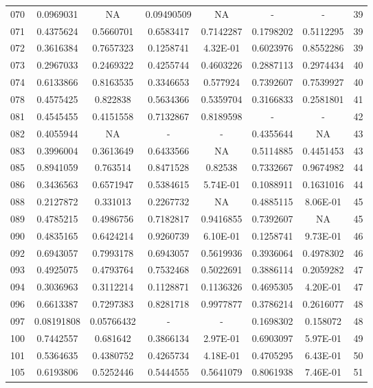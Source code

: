 \begin{anexosenv}
{\begin{longtable}{cccccccc}
070 & 0.0969031 & NA & 0.09490509 & NA & - & - &  39 \\ 
071 & 0.4375624 & 0.5660701 & 0.6583417 & 0.7142287 & 0.1798202 & 0.5112295 & 39 \\ 
072 & 0.3616384 & 0.7657323 & 0.1258741 & 4.32E-01 & 0.6023976 & 0.8552286 & 39 \\ 
073 & 0.2967033 & 0.2469322 & 0.4255744 & 0.4603226 & 0.2887113 & 0.2974434 & 40 \\ 
074 & 0.6133866 & 0.8163535 & 0.3346653 & 0.577924 & 0.7392607 & 0.7539927 & 40 \\ 
078 & 0.4575425 & 0.822838 & 0.5634366 & 0.5359704 & 0.3166833 & 0.2581801 & 41 \\ 
081 & 0.4545455 & 0.4151558 & 0.7132867 & 0.8189598 & - & - &  42 \\ 
082 & 0.4055944 & NA & - & - &  0.4355644 & NA & 43 \\ 
083 & 0.3996004 & 0.3613649 & 0.6433566 & NA & 0.5114885 & 0.4451453 & 43 \\ 
085 & 0.8941059 & 0.763514 & 0.8471528 & 0.82538 & 0.7332667 & 0.9674982 & 44 \\ 
086 & 0.3436563 & 0.6571947 & 0.5384615 & 5.74E-01 & 0.1088911 & 0.1631016 & 44 \\ 
088 & 0.2127872 & 0.331013 & 0.2267732 & NA & 0.4885115 & 8.06E-01 & 45 \\ 
089 & 0.4785215 & 0.4986756 & 0.7182817 & 0.9416855 & 0.7392607 & NA & 45 \\ 
090 & 0.4835165 & 0.6424214 & 0.9260739 & 6.10E-01 & 0.1258741 & 9.73E-01 & 46 \\ 
092 & 0.6943057 & 0.7993178 & 0.6943057 & 0.5619936 & 0.3936064 & 0.4978302 & 46 \\ 
093 & 0.4925075 & 0.4793764 & 0.7532468 & 0.5022691 & 0.3886114 & 0.2059282 & 47 \\ 
094 & 0.3036963 & 0.3112214 & 0.1128871 & 0.1136326 & 0.4695305 & 4.20E-01 & 47 \\ 
096 & 0.6613387 & 0.7297383 & 0.8281718 & 0.9977877 & 0.3786214 & 0.2616077 & 48 \\ 
097 & 0.08191808 & 0.05766432 & - & - &  0.1698302 & 0.158072 & 48 \\ 
100 & 0.7442557 & 0.681642 & 0.3866134 & 2.97E-01 & 0.6903097 & 5.97E-01 & 49 \\ 
101 & 0.5364635 & 0.4380752 & 0.4265734 & 4.18E-01 & 0.4705295 & 6.43E-01 & 50 \\ 
105 & 0.6193806 & 0.5252446 & 0.5444555 & 0.5641079 & 0.8061938 & 7.46E-01 & 51 \\ 

\end{longtable}}
\end{anexosenv}
